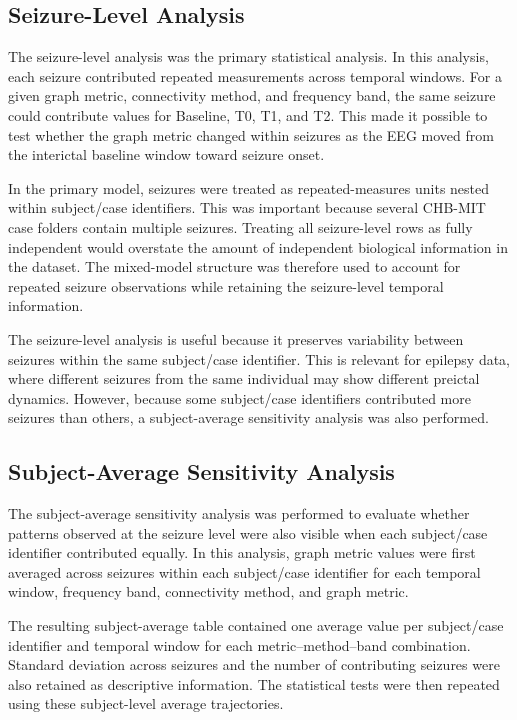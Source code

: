 \subsection{Seizure-Level Analysis}
\label{subsec:seizure-level-analysis}

The seizure-level analysis was the primary statistical analysis. In this
analysis, each seizure contributed repeated measurements across temporal
windows. For a given graph metric, connectivity method, and frequency band, the
same seizure could contribute values for Baseline, T0, T1, and T2. This made it
possible to test whether the graph metric changed within seizures as the EEG
moved from the interictal baseline window toward seizure onset.

In the primary model, seizures were treated as repeated-measures units nested
within subject/case identifiers. This was important because several CHB-MIT
case folders contain multiple seizures. Treating all seizure-level rows as
fully independent would overstate the amount of independent biological
information in the dataset. The mixed-model structure was therefore used to
account for repeated seizure observations while retaining the seizure-level
temporal information.

The seizure-level analysis is useful because it preserves variability between
seizures within the same subject/case identifier. This is relevant for epilepsy
data, where different seizures from the same individual may show different
preictal dynamics. However, because some subject/case identifiers contributed
more seizures than others, a subject-average sensitivity analysis was also
performed.

\subsection{Subject-Average Sensitivity Analysis}
\label{subsec:subject-average-sensitivity-analysis}

The subject-average sensitivity analysis was performed to evaluate whether
patterns observed at the seizure level were also visible when each subject/case
identifier contributed equally. In this analysis, graph metric values were
first averaged across seizures within each subject/case identifier for each
temporal window, frequency band, connectivity method, and graph metric.

The resulting subject-average table contained one average value per
subject/case identifier and temporal window for each metric--method--band
combination. Standard deviation across seizures and the number of contributing
seizures were also retained as descriptive information. The statistical tests
were then repeated using these subject-level average trajectories.

